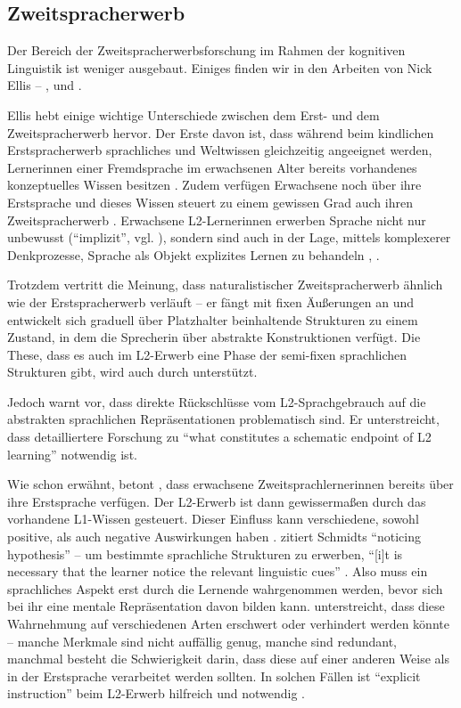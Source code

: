 \subsection{Zweitspracherwerb}
Der Bereich der Zweitspracherwerbsforschung im Rahmen der kognitiven Linguistik ist weniger ausgebaut.
Einiges finden wir in den Arbeiten von Nick Ellis -- \cite{Ellis04}, \cite{Ellis06} und \cite{Ellis08}.

Ellis hebt einige wichtige Unterschiede zwischen dem Erst- und dem Zweitspracherwerb hervor.
Der Erste davon ist, dass während beim kindlichen Erstspracherwerb sprachliches und Weltwissen gleichzeitig angeeignet werden, Lernerinnen einer Fremdsprache im erwachsenen Alter bereits vorhandenes konzeptuelles Wissen besitzen \cite{Ellis08}.
Zudem verfügen Erwachsene noch über ihre Erstsprache und dieses Wissen steuert zu einem gewissen Grad auch ihren Zweitspracherwerb \cite{Ellis08}.
Erwachsene L2-Lernerinnen erwerben Sprache nicht nur unbewusst (``implizit'', vgl. \cite{Ellis04}), sondern sind auch in der Lage, mittels komplexerer Denkprozesse, Sprache als Objekt explizites Lernen zu behandeln \cite{Ellis08}, \cite{Ellis04}.

Trotzdem vertritt \cite{Ellis08} die Meinung, dass naturalistischer Zweitspracherwerb ähnlich wie der Erstspracherwerb verläuft --
er fängt mit fixen Äußerungen an und entwickelt sich graduell über Platzhalter beinhaltende Strukturen zu einem Zustand, in dem die Sprecherin über abstrakte Konstruktionen verfügt.
Die These, dass es auch im L2-Erwerb eine Phase der semi-fixen sprachlichen Strukturen gibt, wird auch durch \cite{Eskildsen08} unterstützt.

Jedoch warnt \cite{Eskildsen08} vor, dass direkte Rückschlüsse vom L2-Sprachgebrauch auf die abstrakten sprachlichen Repräsentationen problematisch sind.
Er unterstreicht, dass detailliertere Forschung zu ``what constitutes a schematic endpoint of L2 learning'' notwendig ist.


Wie schon erwähnt, betont \cite{Ellis08}, dass erwachsene Zweitsprachlernerinnen bereits über ihre Erstsprache verfügen.
Der L2-Erwerb ist dann gewissermaßen durch das vorhandene L1-Wissen gesteuert.
Dieser Einfluss kann verschiedene, sowohl positive, als auch negative Auswirkungen haben \cite{Ellis08}.
\cite{Ellis04} zitiert Schmidts ``noticing hypothesis'' -- um bestimmte sprachliche Strukturen zu erwerben, ``[i]t is necessary that the learner notice the relevant linguistic cues'' \cite{Schmidt90}.
Also muss ein sprachliches Aspekt erst durch die Lernende wahrgenommen werden, bevor sich bei ihr eine mentale Repräsentation davon bilden kann.
\cite{Ellis04} unterstreicht, dass diese Wahrnehmung auf verschiedenen Arten erschwert oder verhindert werden könnte --
manche Merkmale sind nicht auffällig genug,
manche sind redundant,
manchmal besteht die Schwierigkeit darin, dass diese auf einer anderen Weise als in der Erstsprache verarbeitet werden sollten.
In solchen Fällen ist ``explicit instruction'' beim L2-Erwerb hilfreich und notwendig \cite{Ellis04}.

